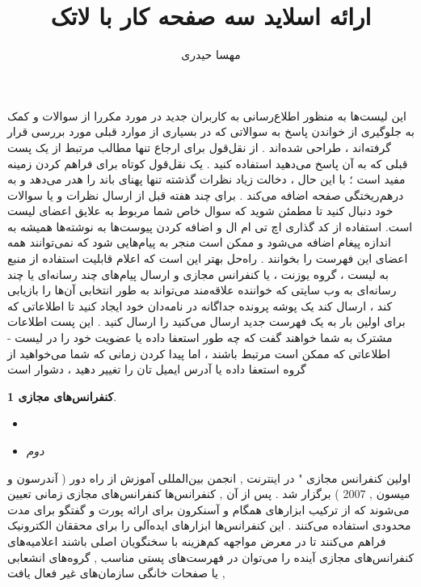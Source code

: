 \documentclass[xcolor=dvipsnames, professionalfont]{beamer}
\author{مهسا حیدری }
\title{ارائه اسلاید سه صفحه کار با لاتک}
\institute{دانشگاه پیام نور تهران شمال}
\newtheorem{Def}{کنفرانس‌های مجازی}
\begin{document}
\frame{\maketitle}

\begin{frame}
	\noindent
این لیست‌ها به منظور اطلاع‌رسانی به کاربران جدید در مورد مکررا از سوالات و کمک به جلوگیری از خواندن پاسخ به سوالاتی که در بسیاری از موارد قبلی مورد بررسی قرار گرفته‌اند ، طراحی شده‌اند . از نقل‌قول برای ارجاع تنها مطالب مرتبط از یک پست قبلی که به آن پاسخ می‌دهید استفاده کنید . یک نقل‌قول کوتاه برای فراهم کردن زمینه مفید است ؛ با این حال ، دخالت زیاد نظرات گذشته تنها پهنای باند را هدر می‌دهد و به درهم‌ریختگی صفحه اضافه می‌کند . برای چند هفته قبل از ارسال نظرات و یا سوالات خود دنبال کنید تا مطمئن شوید که سوال خاص شما مربوط به علایق اعضای لیست است.
استفاده از کد گذاری اچ تی ام ال و اضافه کردن پیوست‌ها به نوشته‌ها همیشه به اندازه پیغام اضافه می‌شود و ممکن است منجر به پیام‌هایی شود که نمی‌توانند همه اعضای این فهرست را بخوانند . راه‌حل بهتر این است که اعلام قابلیت استفاده از منبع به لیست ، گروه یوزنت ، یا کنفرانس مجازی و ارسال پیام‌های چند رسانه‌ای یا چند رسانه‌ای به وب سایتی که خواننده علاقه‌مند می‌تواند به طور انتخابی آن‌ها را بازیابی کند ، ارسال کند
یک پوشه پرونده جداگانه در نامه‌دان خود ایجاد کنید تا اطلاعاتی که برای اولین بار به یک فهرست جدید ارسال می‌کنید را ارسال کنید . این پست اطلاعات مشترک به شما خواهند گفت که چه طور استعفا داده یا عضویت خود را در لیست - اطلاعاتی که ممکن است مرتبط باشند ، اما پیدا کردن زمانی که شما می‌خواهید از گروه استعفا داده یا آدرس ایمیل تان را تغییر دهید ، دشوار است







	\begin{Def}
\begin{itemize}
	\raggedright
	\item 
	
	\item
	دوم
\end{itemize}
\end{Def}
\end{frame}
اولین کنفرانس مجازی " در اینترنت , انجمن بین‌المللی آموزش از راه دور ( آندرسون و میسون , 2007 ) برگزار شد . پس از آن , کنفرانس‌ها کنفرانس‌های مجازی زمانی تعیین می‌شوند که از ترکیب ابزارهای همگام و آسنکرون برای ارائه پورت و گفتگو برای مدت محدودی استفاده می‌کنند . این کنفرانس‌ها ابزارهای ایده‌آلی را برای محققان الکترونیک فراهم می‌کنند تا در معرض مواجهه کم‌هزینه با سخنگویان اصلی باشند  اعلامیه‌های کنفرانس‌های مجازی آینده را می‌توان در فهرست‌های پستی مناسب , گروه‌های انشعابی , یا صفحات خانگی سازمان‌های غیر فعال یافت
\end{document}
